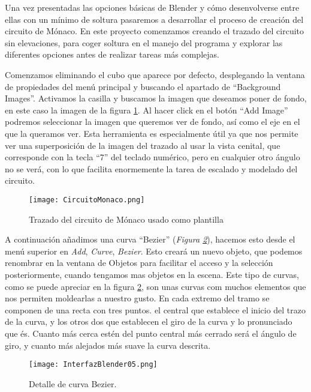 Una vez presentadas las opciones básicas de Blender y cómo desenvolverse entre ellas con un mínimo de soltura pasaremos a desarrollar el proceso de creación del circuito de Mónaco. En este proyecto comenzamos creando el trazado del circuito  sin elevaciones, para coger soltura en el manejo del programa y explorar las diferentes opciones antes de realizar tareas más complejas.

Comenzamos eliminando el cubo que aparece por defecto, desplegando la ventana de propiedades del menú principal y buscando el apartado de “Background Images”. Activamos la casilla y buscamos la imagen que deseamos poner de fondo, en este caso la imagen de la figura  \ref{fig:circuitomonaco}. Al hacer click en el botón “Add Image” podremos seleccionar la imagen que queremos ver de fondo, así como el eje en el que la queramos ver. Esta herramienta es especialmente útil ya que  nos permite ver una superposición de la imagen del trazado al usar la vista cenital, que corresponde con la tecla “7” del teclado numérico, pero en cualquier otro ángulo no se verá, con lo que facilita enormemente la tarea de escalado y modelado del circuito.

\begin{figure}[ht]
	\centering
	\texttt{[image: CircuitoMonaco.png]}
	\caption{Trazado del circuito de Mónaco usado como plantilla} \label{fig:circuitomonaco}
\end{figure}

A continuación añadimos una curva “Bezier” (\textit{Figura \ref{fig:interfazblender05}}), hacemos esto desde el menú superior en \textit{Add}, \textit{Curve}, \textit{Bezier}. Esto creará un nuevo objeto, que podemos renombrar en la ventana de Objetos para facilitar el acceso y la selección posteriormente, cuando tengamos mas objetos en la escena. Este tipo de curvas, como se puede apreciar en la figura \ref{fig:interfazblender05}, son unas curvas com muchos elementos que nos permiten moldearlas a nuestro gusto. En cada extremo del tramo se componen de una recta con tres puntos. el central que establece el inicio del trazo de la curva, y los otros dos que establecen el giro de la curva y lo pronunciado que és. Cuanto más cerca estén del punto central más cerrado será el ángulo de giro, y cuanto más alejados más suave la curva descrita.

\begin{figure}[h]
	\centering
	\texttt{[image: InterfazBlender05.png]}
	\caption{Detalle de curva Bezier.} \label{fig:interfazblender05}
\end{figure}

